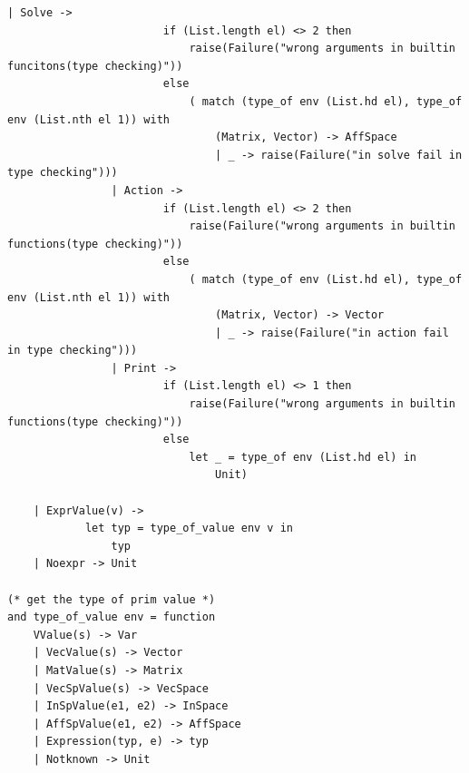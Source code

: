 \documentclass[12pt]{article} %
\begin{document}
\begin{lstlisting}[style=appendix, caption=check.ml]
                | Solve ->
                        if (List.length el) <> 2 then
                            raise(Failure("wrong arguments in builtin funcitons(type checking)"))
                        else
                            ( match (type_of env (List.hd el), type_of env (List.nth el 1)) with
                                (Matrix, Vector) -> AffSpace
                                | _ -> raise(Failure("in solve fail in type checking")))
                | Action -> 
                        if (List.length el) <> 2 then
                            raise(Failure("wrong arguments in builtin functions(type checking)"))
                        else
                            ( match (type_of env (List.hd el), type_of env (List.nth el 1)) with
                                (Matrix, Vector) -> Vector
                                | _ -> raise(Failure("in action fail in type checking")))
                | Print -> 
                        if (List.length el) <> 1 then
                            raise(Failure("wrong arguments in builtin functions(type checking)"))
                        else
                            let _ = type_of env (List.hd el) in
                                Unit)
   
    | ExprValue(v) -> 
            let typ = type_of_value env v in
                typ
    | Noexpr -> Unit

(* get the type of prim value *)
and type_of_value env = function
    VValue(s) -> Var
    | VecValue(s) -> Vector
    | MatValue(s) -> Matrix
    | VecSpValue(s) -> VecSpace
    | InSpValue(e1, e2) -> InSpace
    | AffSpValue(e1, e2) -> AffSpace
    | Expression(typ, e) -> typ
    | Notknown -> Unit
\end{lstlisting}
\end{document}
